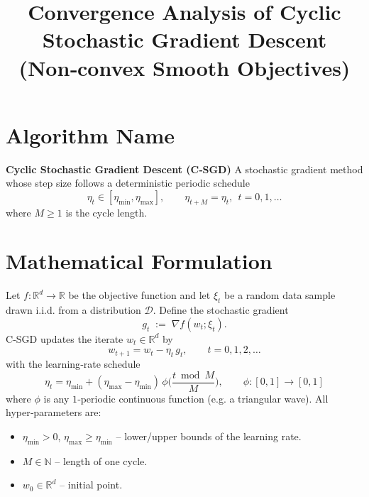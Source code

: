 \documentclass[11pt]{article}
\begin{document}
\title{Convergence Analysis of Cyclic Stochastic Gradient Descent\\(Non‑convex Smooth Objectives)}
\author{}
\date{}
\maketitle

\section*{Algorithm Name}
\textbf{Cyclic Stochastic Gradient Descent (C‑SGD)}  
A stochastic gradient method whose step size follows a deterministic periodic schedule
\[
\eta_t \in [\eta_{\min},\eta_{\max}],\qquad 
\eta_{t+M}= \eta_t,\ \ t=0,1,\dots
\]
where $M\ge 1$ is the cycle length.

\section*{Mathematical Formulation}
Let $f:\mathbb{R}^d\to\mathbb{R}$ be the objective function and let $\xi_t$ be a random data sample drawn i.i.d. from a distribution $\mathcal{D}$.  
Define the stochastic gradient
\[
g_t \;:=\; \nabla f(w_t;\xi_t).
\]
C‑SGD updates the iterate $w_t\in\mathbb{R}^d$ by
\begin{equation}
\boxed{ \; w_{t+1}= w_t - \eta_t\, g_t ,\qquad t=0,1,2,\dots\;}
\label{eq:update}
\end{equation}
with the learning‑rate schedule
\begin{equation}
\eta_t = \eta_{\min} + (\eta_{\max}-\eta_{\min})\,
\phi\!\Big(\frac{t\bmod M}{M}\Big),\qquad 
\phi:[0,1]\to[0,1]
\end{equation}
where $\phi$ is any $1$‑periodic continuous function (e.g. a triangular wave).  
All hyper‑parameters are:
\begin{itemize}[noitemsep]
\item $\eta_{\min}>0$, $\eta_{\max}\ge\eta_{\min}$ – lower/upper bounds of the learning rate.
\item $M\in\mathbb{N}$ – length of one cycle.
\item $w_0\in\mathbb{R}^d$ – initial point.
\end{itemize}

\end{document}
